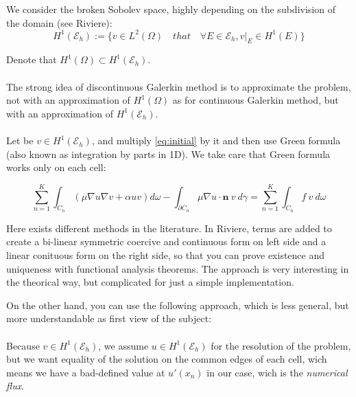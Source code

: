 \documentclass[a4paper,10pt,draft]{article}
\begin{document}
 We consider the broken Sobolev space, highly depending on the subdivision of the domain (see 
Riviere):
 \begin{equation}
  H^1(\mathcal{E}_h) := \{ v \in L^2(\Omega) \quad that \quad \forall E \in \mathcal{E}_h, v|_E \in 
H^1(E) \}
 \end{equation}

 Denote that $H^1(\Omega) \subset H^1(\mathcal{E}_h)$.
 
 \paragraph{}
 The strong idea of discontinuous Galerkin method is to approximate the problem, not with an 
approximation of $H^1(\Omega)$ as for continuous Galerkin method, but with an approximation of 
$H^1(\mathcal{E}_h)$.


\paragraph{}
Let be $v \in H^1(\mathcal{E}_h)$, and multiply \ref{eq:initial} by it and then use Green formula 
(also known as integration by parts in 1D). We take care that Green formula works only on each cell:

\begin{equation}\label{eq:weak}
 \sum \limits_{n=1}^K \int_{C_n} (\mu \nabla u \nabla v + \alpha uv) d\omega - \int_{\partial C_n} 
\mu \nabla u \cdot \mathbf{n}\ v\ d\gamma = 
\sum \limits_{n=1}^K \int_{C_n}  f\ v\ d\omega
\end{equation}

Here exists different methods in the literature. In Riviere, terms are added to create a bi-linear 
symmetric coercive and continuous form on left side and a linear conituous form on the right side, 
so that you can prove existence and uniqueness with functional analysis theorems. The approach is 
very interesting in the theorical way, but complicated for just a simple implementation.

On the other hand, you can use the following approach, which is less general, but more 
understandable as first view of the subject:

\paragraph{}
Because $v \in H^1(\mathcal{E}_h)$, we assume $u \in H^1(\mathcal{E}_h)$ for the resolution of the 
problem, but we want equality of the solution on the common edges of each cell, wich means we have 
a bad-defined value at $u'(x_n)$ in our case, wich is the \emph{numerical flux}.
\end{document}
